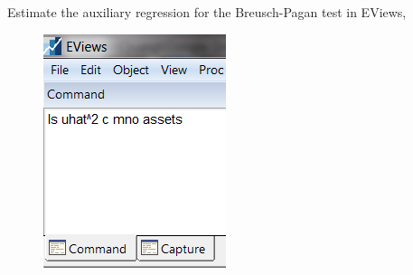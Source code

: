 \documentclass[12pt]{report}
\begin{document}
\noindent Estimate the auxiliary regression for the Breusch-Pagan test in EViews,
\begin{figure}[H]
	\centering
	\includegraphics{tute10_1}
\end{figure}
\vspace{-\baselineskip}
\end{document}

